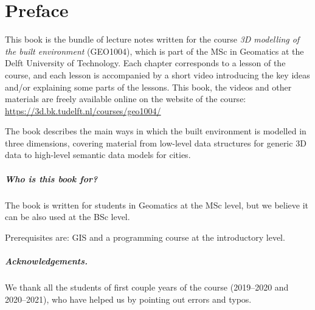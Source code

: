 


\chapter*{Preface}

This book is the bundle of lecture notes written for the course \emph{3D modelling of the built environment} (GEO1004), which is part of the MSc in Geomatics at the Delft University of Technology.
Each chapter corresponds to a lesson of the course, and each lesson is accompanied by a short video introducing the key ideas and/or explaining some parts of the lessons.
This book, the videos and other materials are freely available online on the website of the course: \url{https://3d.bk.tudelft.nl/courses/geo1004/}

The book describes the main ways in which the built environment is modelled in three dimensions, covering material from low-level data structures for generic 3D data to high-level semantic data models for cities.

\paragraph*{Who is this book for?}
The book is written for students in Geomatics at the MSc level, but we believe it can be also used at the BSc level.

Prerequisites are: GIS and a programming course at the introductory level.


\paragraph*{Acknowledgements.}
We thank all the students of first couple years of the course (2019--2020 and 2020--2021), who have helped us by pointing out errors and typos.






